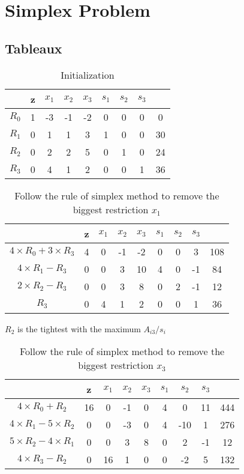 \documentclass[12pt,a4paper]{article}
\theoremstyle{definition}
\begin{document}
\section{Simplex Problem}
\subsection{Tableaux}
\begin{table}[h]
    \centering
    \begin{tabular}{|c|c|cccccc|c|}
    \hline
    &z & $x_1$ & $x_2$ & $x_3$ & $s_1$ & $s_2$ & $s_3$  &    \\ \hline
    $R_0$&1 & -3 & -1 & -2 & 0  & 0  & 0   & 0  \\
    $R_1$&0 & 1  & 1  & 3  & 1  & 0  & 0   & 30 \\
    $R_2$&0 & 2  & 2  & 5  & 0  & 1  & 0   & 24 \\
    $R_3$&0 & 4  & 1  & 2  & 0  & 0  & 1   & 36 \\ \hline
    \end{tabular}
    \caption{Initialization}
\end{table}
\begin{table}[h]
    \centering
    \begin{tabular}{|c|c|cccccc|c|}
    \hline
    & z & $x_1$ & $x_2$ & $x_3$ & $s_1$ & $s_2$ & $s_3$  &    \\ \hline
    $4\times R_0+3 \times R_3$& 4 & 0 & -1 & -2 & 0  & 0  & 3   & 108  \\
    $4 \times R_1 - R_3$& 0 & 0  & 3  & 10  & 4  & 0  & -1   & 84 \\
    $2 \times R_2-R_3$& 0 & 0  & 3  & 8  & 0  & 2  & -1   & 12\\
    $R_3$& 0 & 4  & 1  & 2  & 0  & 0  & 1   & 36 \\ \hline
    \end{tabular}
    \caption{Follow the rule of simplex method to remove the biggest restriction $x_1$}
\end{table}
$R_2$ is the tightest with the maximum $A_{i3}/s_i$\\
\begin{table}[h]
    \centering
    \begin{tabular}{|c|c|cccccc|c|}
    \hline
    & z & $x_1$ & $x_2$ & $x_3$ & $s_1$ & $s_2$ & $s_3$  &    \\ \hline
    $4\times R_0+R_2$& 16 & 0 & -1 & 0 & 4  & 0  & 11   & 444  \\
    $4 \times R_1 - 5 \times R_2$& 0 & 0  & -3 & 0  & 4  & -10  & 1   & 276 \\
    $5 \times R_2-4\times R_1$& 0 & 0  & 3  & 8  & 0  & 2  & -1   & 12 \\
    $4 \times R_3-R_2$& 0 & 16  & 1  & 0  & 0  & -2  & 5   & 132 \\ \hline
    \end{tabular}
    \caption{Follow the rule of simplex method to remove the biggest restriction $x_3$}
\end{table}
\end{document}
